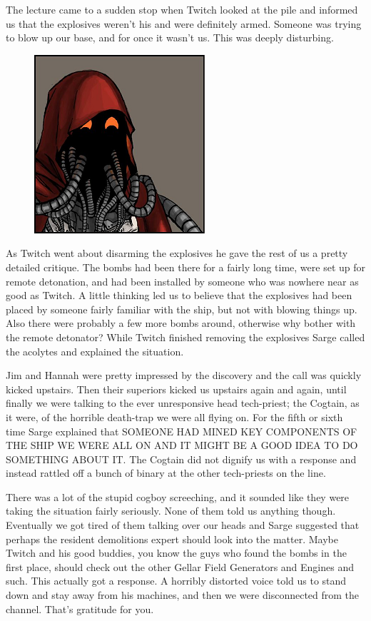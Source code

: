 The lecture came to a sudden stop when Twitch looked at the pile and informed us that the explosives weren’t his and were definitely armed. 
Someone was trying to blow up our base, and for once it wasn’t us. 
This was deeply disturbing.

\begin{figure}
	\begin{center}
		\includegraphics[width=\figwidth]{pics/7/18.png}
	\end{center}
\end{figure}
As Twitch went about disarming the explosives he gave the rest of us a pretty detailed critique. 
The bombs had been there for a fairly long time, were set up for remote detonation, and had been installed by someone who was nowhere near as good as Twitch. 
A little thinking led us to believe that the explosives had been placed by someone fairly familiar with the ship, but not with blowing things up. 
Also there were probably a few more bombs around, otherwise why bother with the remote detonator? 
While Twitch finished removing the explosives Sarge called the acolytes and explained the situation.

Jim and Hannah were pretty impressed by the discovery and the call was quickly kicked upstairs. 
Then their superiors kicked us upstairs again and again, until finally we were talking to the ever unresponsive head tech-priest; 
the Cogtain, as it were, of the horrible death-trap we were all flying on. 
For the fifth or sixth time Sarge explained that SOMEONE HAD MINED KEY COMPONENTS OF THE SHIP WE WERE ALL ON AND IT MIGHT BE A GOOD IDEA TO DO SOMETHING ABOUT IT. 
The Cogtain did not dignify us with a response and instead rattled off a bunch of binary at the other tech-priests on the line. 


There was a lot of the stupid cogboy screeching, and it sounded like they were taking the situation fairly seriously. 
None of them told us anything though. 
Eventually we got tired of them talking over our heads and Sarge suggested that perhaps the resident demolitions expert should look into the matter. 
Maybe Twitch and his good buddies, you know the guys who found the bombs in the first place, should check out the other Gellar Field Generators and Engines and such. 
This actually got a response. 
A horribly distorted voice told us to stand down and stay away from his machines, and then we were disconnected from the channel. 
That’s gratitude for you.

